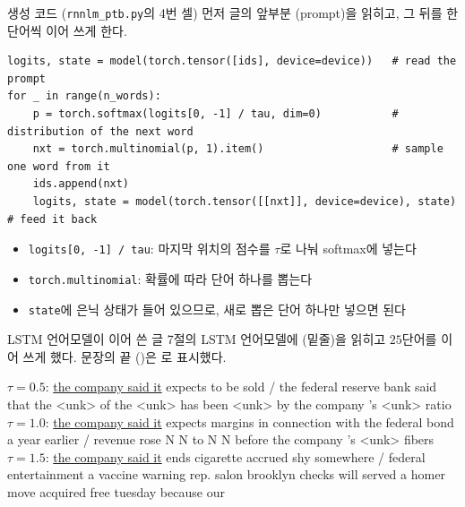 \documentclass[aspectratio=169,11pt]{beamer}
\begin{document}
\begin{frame}[fragile]{생성 코드 (\texttt{rnnlm\_ptb.py}의 4번 셀)}
먼저 글의 앞부분 (prompt)을 읽히고, 그 뒤를 한 단어씩 이어 쓰게 한다.
\begin{lstlisting}
logits, state = model(torch.tensor([ids], device=device))   # read the prompt
for _ in range(n_words):
    p = torch.softmax(logits[0, -1] / tau, dim=0)           # distribution of the next word
    nxt = torch.multinomial(p, 1).item()                    # sample one word from it
    ids.append(nxt)
    logits, state = model(torch.tensor([[nxt]], device=device), state)   # feed it back
\end{lstlisting}
\begin{itemize}
\item \texttt{logits[0, -1] / tau}: 마지막 위치의 점수를 $\tau$로 나눠 softmax에 넣는다
\item \texttt{torch.multinomial}: 확률에 따라 단어 하나를 뽑는다
\item \texttt{state}에 은닉 상태가 들어 있으므로, 새로 뽑은 단어 하나만 넣으면 된다
\end{itemize}
\end{frame}

\begin{frame}{LSTM 언어모델이 이어 쓴 글}
7절의 LSTM 언어모델에  (밑줄)을 읽히고 $25$단어를 이어 쓰게 했다.
문장의 끝 ()은 \w{/}로 표시했다.
\vskip2mm
\begin{remarkbox}
\ttfamily\footnotesize\linespread{1.2}\selectfont\raggedright
\textrm{$\tau=0.5$:} \underline{the company said it} expects to be sold / the federal reserve bank said that the <unk> of the <unk> has been <unk> by the company 's <unk> ratio\\[0.6em]
\textrm{$\tau=1.0$:} \underline{the company said it} expects margins in connection with the federal bond a year earlier / revenue rose N N to N N before the company 's <unk> fibers\\[0.6em]
\textrm{$\tau=1.5$:} \underline{the company said it} ends cigarette accrued shy somewhere / federal entertainment a vaccine warning rep. salon brooklyn checks will served a homer move acquired free tuesday because our
\end{remarkbox}
\end{frame}
\end{document}
